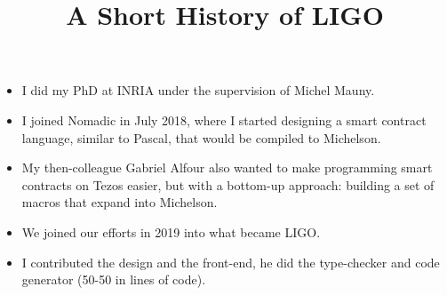 \documentclass[wide]{slides}
\begin{document}
\maketitle

\begin{slide}
  \title{A Short History of LIGO}

  \begin{itemize}

    \item I did my PhD at INRIA under the supervision of Michel Mauny.

    \item I joined Nomadic in July 2018, where I started designing a
      smart contract language, similar to \textsf{Pascal}, that would
      be compiled to Michelson.

    \item My then-colleague Gabriel Alfour also wanted to make
      programming smart contracts on \textsf{Tezos} easier, but with a
      bottom\hyp{}up approach: building a set of macros that expand
      into Michelson.

    \item We joined our efforts in 2019 into what became LIGO.

    \item I contributed the design and the front-end, he did the
      type-checker and code generator (50-50 in lines of code).

  \end{itemize}
\end{slide}
\end{document}
